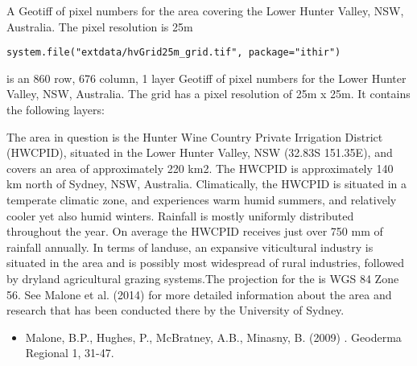 \documentclass[a4paper]{book}
\begin{document}
%
\begin{Description}
A Geotiff of pixel numbers for the area covering the Lower Hunter Valley, NSW, Australia. The pixel resolution is 25m
\end{Description}
%
\begin{Usage}
\begin{verbatim}
system.file("extdata/hvGrid25m_grid.tif", package="ithir")
\end{verbatim}
\end{Usage}
%
\begin{Format}
 is an 860 row, 676 column, 1 layer Geotiff of pixel numbers for the Lower Hunter Valley, NSW, Australia. The grid has a pixel resolution of 25m x 25m. It contains the following layers:
\end{Format}
%
\begin{Details}
The area in question is the Hunter Wine Country Private Irrigation District (HWCPID), situated in the Lower Hunter Valley, NSW (32.83S 151.35E), and covers an area of approximately 220 km2. The HWCPID is approximately 140 km north of Sydney, NSW, Australia. Climatically, the HWCPID is situated in a temperate climatic zone, and experiences warm humid summers, and relatively cooler yet also humid winters. Rainfall is mostly uniformly distributed throughout the year. On average the HWCPID receives just over 750 mm of rainfall annually. In terms of landuse, an expansive viticultural industry is situated in the area and is possibly most widespread
of rural industries, followed by dryland agricultural grazing systems.The projection for the  is WGS 84 Zone 56. See Malone et al. (2014) for more detailed information about the area and research that has been conducted there by the University of Sydney.
\end{Details}
%
\begin{References}
\begin{itemize}

\item{} Malone, B.P., Hughes, P.,  McBratney, A.B., Minasny, B. (2009) . Geoderma Regional 1, 31-47.

\end{itemize}

\end{References}
\end{document}
